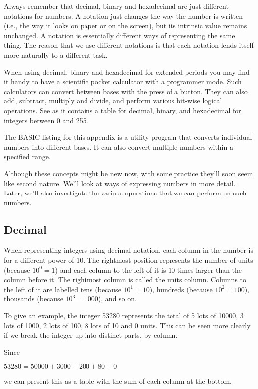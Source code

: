 Always remember that decimal, binary and hexadecimal are just different notations for numbers. A notation just changes the way the number is written (i.e., the way it looks on paper or on the screen), but its intrinsic value remains unchanged. A notation is essentially different ways of representing the same thing. The reason that we use different notations is that each notation lends itself more naturally to a different task.

When using decimal, binary and hexadecimal for extended periods you may find it handy to have a scientific pocket calculator with a programmer mode. Such calculators can convert between bases with the press of a button. They can also add, subtract, multiply and divide, and perform various bit-wise logical operations.
See  as it contains a  table for decimal, binary, and hexadecimal for integers between 0 and 255.

The BASIC listing for this appendix is a utility program that converts individual numbers into different bases. It can also convert multiple numbers within a specified range.

Although these concepts might be new now, with some practice they'll soon seem like second nature. We’ll look at ways of expressing numbers in more detail. Later, we’ll also investigate the various operations that we can perform on such numbers.

\subsection{Decimal}
When representing integers using decimal notation, each column in the number is for a different power of 10. The rightmost position represents the number of units (because $10^{0} = 1$) and each column to the left of it is 10 times larger than the column before it. The rightmost column is called the units column. Columns to the left of it are labelled tens (because $10^{1} = 10$), hundreds (because $10^{2} = 100$), thousands (because $10^{3} = 1000$), and so on.

To give an example, the integer 53280 represents the total of 5 lots of 10000, 3 lots of 1000, 2 lots of 100, 8 lots of 10 and 0 units. This can be seen more clearly if we break the integer up into distinct parts, by column.

Since
\begin{center}
  $53280 = 50000 + 3000 + 200 + 80 + 0$
\end{center}
we can present this as a table with the sum of each column at the bottom.

